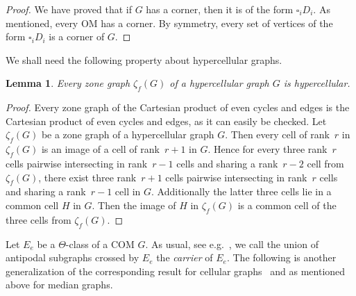 \documentclass[final,11pt]{article}
\newtheorem{lem}[thm]{Lemma}%
\begin{document}
\begin{proof}
We have proved that if $G$ has a corner, then it is of the form $\square_i D_i$. As mentioned, every OM has a corner. By symmetry, every set of vertices of the form $\square_i D_i$ is a corner of $G$.
\end{proof}

We shall need the following property about hypercellular graphs.
\begin{lem}\label{lem:hypercellularzoneclosed}
Every zone graph $\zeta_f(G)$ of a hypercellular graph $G$ is hypercellular.
\end{lem}
\begin{proof}
Every zone graph of the Cartesian product of even cycles and edges is the Cartesian product of even cycles and edges, as it can easily be checked. Let $\zeta_f(G)$ be a zone graph of a hypercellular graph $G$. Then every cell of rank~$r$ in $\zeta_f(G)$ is an image of a cell of rank~$r+1$ in $G$. Hence  for every three rank~$r$ cells pairwise intersecting in rank~$r-1$ cells and sharing a rank~$r-2$ cell from $\zeta_f(G)$, there exist three rank~$r + 1$ cells pairwise intersecting in rank~$r$ cells and sharing a rank~$r-1$ cell in $G$. Additionally the latter three cells lie in a common cell $H$ in $G$. Then the image of $H$ in $\zeta_f(G)$ is a common cell of the three cells from $\zeta_f(G)$.
\end{proof}

Let  $E_e$ be a $\Theta$-class of a COM $G$. As usual, see e.g.~\cite{Ban-18,Che-16}, we call the union of antipodal subgraphs crossed by $E_e$ the \emph{carrier} of  $E_e$. The following is another generalization of the corresponding result for cellular graphs~\cite{Ban-96} and as mentioned above for median graphs.
\end{document}
